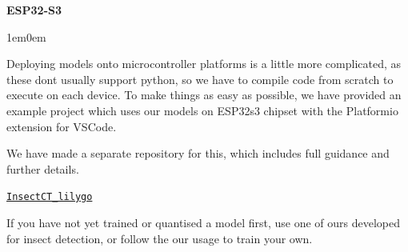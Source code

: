 {\bfseries{ESP32-\/\+S3}}\begin{adjustwidth}{1em}{0em}


Deploying models onto microcontroller platforms is a little more complicated, as these don\textquotesingle{}t usually support python, so we have to compile code from scratch to execute on each device. To make things as easy as possible, we have provided an example project which uses our models on ESP32s3 chipset with the Platformio extension for VSCode.

We have made a separate repository for this, which includes full guidance and further details.

\href{https://github.com/rossGardiner/InsectCT_lilygo/}{\texttt{Insect\+CT\+\_\+lilygo}}

\end{adjustwidth}


If you have not yet trained or quantised a model first, use one of ours developed for insect detection, or follow the our usage  to train your own. 